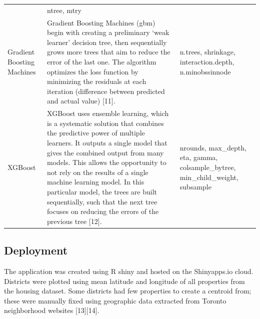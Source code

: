 \documentclass[11pt,]{article}
\begin{document}
\begin{longtable}[]{@{}lll@{}}
\begin{minipage}[t]{0.63\columnwidth}
\end{minipage} & \begin{minipage}[t]{0.21\columnwidth}\raggedright
ntree, mtry\strut
\end{minipage}\tabularnewline
\begin{minipage}[t]{0.08\columnwidth}\raggedright
Gradient Boosting Machines\strut
\end{minipage} & \begin{minipage}[t]{0.63\columnwidth}\raggedright
Gradient Boosting Machines (gbm) begin with creating a preliminary `weak
learner' decision tree, then sequentially grows more trees that aim to
reduce the error of the last one. The algorithm optimizes the loss
function by minimizing the residuals at each iteration (difference
between predicted and actual value) {[}11{]}.\strut
\end{minipage} & \begin{minipage}[t]{0.21\columnwidth}\raggedright
n.trees, shrinkage, interaction.depth, n.minobssinnode\strut
\end{minipage}\tabularnewline
\begin{minipage}[t]{0.08\columnwidth}\raggedright
XGBoost\strut
\end{minipage} & \begin{minipage}[t]{0.63\columnwidth}\raggedright
XGBoost uses ensemble learning, which is a systematic solution that
combines the predictive power of multiple learners. It outputs a single
model that gives the combined output from many models. This allows the
opportunity to not rely on the results of a single machine learning
model. In this particular model, the trees are built sequentially, such
that the next tree focuses on reducing the errors of the previous tree
{[}12{]}.\strut
\end{minipage} & \begin{minipage}[t]{0.21\columnwidth}\raggedright
nrounds, max\_depth, eta, gamma, colsample\_bytree, min\_child\_weight,
subsample\strut
\end{minipage}\tabularnewline
\bottomrule
\end{longtable}

\hypertarget{deployment}{%
\subsection{Deployment}\label{deployment}}

The application was created using R shiny and hosted on the Shinyapps.io
cloud. Districts were plotted using mean latitude and longitude of all
properties from the housing dataset. Some districts had few properties
to create a centroid from; these were manually fixed using geographic
data extracted from Toronto neighborhood websites {[}13{]}{[}14{]}.
\end{document}
